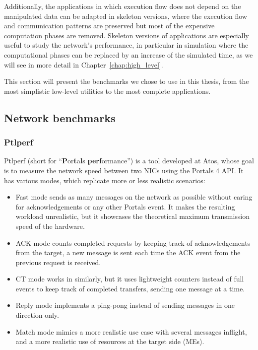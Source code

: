 Additionally, the applications in which execution flow does not depend on the
manipulated data can be adapted in skeleton versions, where the execution flow
and communication patterns are preserved but most of the expensive computation
phases are removed. Skeleton versions of applications are especially useful to
study the network's performance, in particular in simulation where the
computational phases can be replaced by an increase of the simulated time, as we
will see in more detail in Chapter~\ref{chap:high_level}.

This section will present the benchmarks we chose to use in this thesis, from
the most simplistic low-level utilities to the most complete applications.

\subsection{Network benchmarks}

\subsubsection{Ptlperf}
\label{subsubsec:2_context_hpc:ptlperf}

Ptlperf (short for ``\textbf{P}or\textbf{t}a\textbf{l}s \textbf{perf}ormance'')
is a tool developed at Atos, whose goal is to measure the network speed between
two NICs using the Portals 4 API. It has various modes, which replicate more or
less realistic scenarios:
\begin{itemize}
    \item Fast mode sends as many messages on the network as possible without
    caring for acknowledgements or any other Portals event. It makes the
    resulting workload unrealistic, but it showcases the theoretical maximum
    transmission speed of the hardware.
    \item ACK mode counts completed requests by keeping track of
    acknowledgements from the target, a new message is sent each time the ACK
    event from the previous request is received.
    \item CT mode works in similarly, but it uses lightweight counters instead
    of full events to keep track of completed transfers, sending one message at
    a time.
    \item Reply mode implements a ping-pong instead of sending messages in one
    direction only.
    \item Match mode mimics a more realistic use case with several messages
    inflight, and a more realistic use of resources at the target side (MEs).
\end{itemize}

